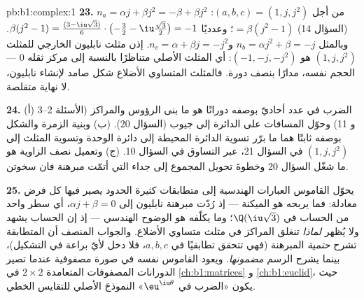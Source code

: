 \begin{solution}{pb:b1:complex:1}
\textbf{23.} من أجل $(a, b, c) = (1, j, j^2)$: $n_a = \alpha j +
\beta j^2 = -\beta + \beta j^2$ (السؤال 14) $= \beta(j^2 - 1)$؛
وعدديًا $\beta(j^2 - 1) = \frac{(3 - \iu\sqrt3)}6 \cdot
\bigl(-\frac32 - \iu\frac{\sqrt3}2\bigr) = -1$. وبالمثل $n_b =
\alpha j^2 + \beta = -j$ و$n_c = \alpha + \beta j = -j^2$. إذن
مثلث نابليون الخارجي للمثلث $(1, j, j^2)$ هو $(-1, -j, -j^2)$: أي
المثلث الأصلي متناظرًا بالنسبة إلى مركز ثقله $0$ --- الحجم نفسه،
مدارًا بنصف دورة. فالمثلث المتساوي الأضلاع شكل صامد
لإنشاء نابليون، لا نهاية متقلصة.

\textbf{24.} (أ) الضرب في عدد أحاديّ  بوصفه دورانًا
هو ما بنى الرؤوس والمراكز (الأسئلة 2--3 و 11) وحوّل
المسافات على الدائرة إلى جيوب (السؤال 20). (ب) وبنية الزمرة
والشكل بوصفه ثابتًا هما ما برّر تسوية الدائرة
المحيطة إلى دائرة الوحدة وتسوية المثلث إلى $(1, j, j^2)$
في السؤال 21، عبر التساوق في السؤال 10. (ج) وتعميل
نصف الزاوية هو ما شغّل السؤال 20 وخطوةَ تحويل المجموع إلى
جداء التي أتمّت مبرهنة فان سخوتن.

\textbf{25.} يحوّل القاموس العبارات الهندسية إلى
متطابقات كثيرة الحدود يصير فيها كل فرض معادلة:
فما يربحه هو الميكنة --- إذ رُدّت مبرهنة نابليون إلى
$\alpha j + \beta = 0$، أي سطر واحد من الحساب في
$\Q(\iu\sqrt3)$؛ وما يكلّفه هو الوضوح الهندسي --- إذ إن
الحساب يشهد ولا يُظهر \emph{لماذا} تنغلق المراكز
في مثلث متساوي الأضلاع. والجواب المنصف أن
المتطابقة تشرح \emph{حتمية} المبرهنة (فهي تتحقق
تطابقيًا في $a, b, c$، فلا دخل لأيّ براعة في التشكيل)،
بينما يشرح الرسم \emph{مضمونها}. ويعود القاموس
نفسه في صورة مصفوفية عندما تصير الدورانات
المصفوفات المتعامدة $2 \times 2$ في \cref{ch:b1:matrices} و
\cref{ch:b1:euclid}، حيث يكون «الضرب في
$\eu^{\iu\theta}$» النموذجَ الأصلي للتقايس الخطي.
\end{solution}

